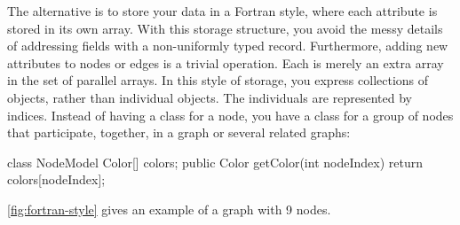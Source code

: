 \newcommand{\light}[1]{\footnotesize{\textcolor{Lighter}{#1}}}

The alternative is to store your data in a Fortran style, where each attribute is
stored in its own array. With this storage structure, you avoid the messy details
of addressing fields with a non-uniformly typed record. Furthermore, adding new
attributes to nodes or edges is a trivial operation. Each is merely an extra
array in the set of parallel arrays. In this style of storage, you express
collections of objects, rather than individual objects. The individuals are
represented by indices. Instead of having a class for a node, you have a class
for a group of nodes that participate, together, in a graph or several related
graphs:
\begin{shortlisting}
class NodeModel {
	Color[] colors;
	public Color getColor(int nodeIndex) {
		return colors[nodeIndex];
	}
}
\end{shortlisting}
\autoref{fig:fortran-style} gives an example of a graph with 9 nodes.

